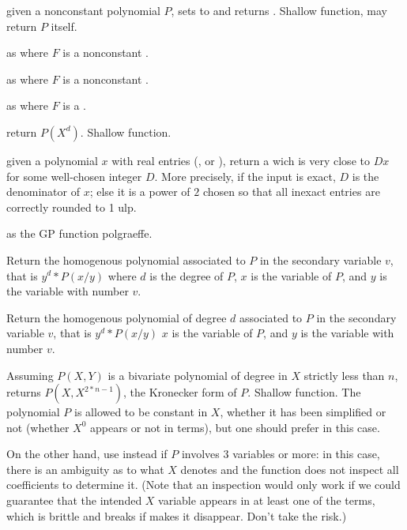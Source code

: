 given a nonconstant polynomial
$P$, sets  to  and
returns . Shallow function, may return $P$ itself.

as  where $F$ is a nonconstant .

as  where $F$ is a nonconstant .

as  where $F$ is a .

 return $P(X^d)$. Shallow function.

 given a polynomial $x$ with real entries
(,  or ), return a  wich is very close
to $D x$ for some well-chosen integer $D$. More precisely, if the input is
exact, $D$ is the denominator of $x$; else it is a power of $2$ chosen
so that all inexact entries are correctly rounded to 1 ulp.

 as the GP function polgraeffe.

 Return the homogenous polynomial
associated to $P$ in the secondary variable $v$, that is $y^d*P(x/y)$ where $d$
is the degree of $P$, $x$ is the variable of $P$, and  $y$ is the variable with
number $v$.

 Return the homogenous
polynomial of degree $d$ associated to $P$ in the secondary variable $v$, that
is $y^d*P(x/y)$ $x$ is the variable of $P$, and  $y$ is the variable with
number $v$.

 Assuming $P(X,Y)$ is a bivariate
polynomial of degree in $X$ strictly less than $n$, returns $P(X,X^{2*n-1})$,
the Kronecker form of $P$. Shallow function.
The polynomial $P$ is allowed to be constant in $X$, whether it has been
simplified or not (whether $X^0$ appears or not in terms), but one should
prefer  in this case.

On the other hand, use  instead if $P$ involves
3 variables or more: in this case, there is an ambiguity as to what $X$
denotes and the function does not inspect all coefficients to determine it.
(Note that an inspection would only work if we could guarantee that the
intended $X$ variable appears in at least one of the terms, which is brittle
and breaks if  makes it disappear. Don't take the risk.)

